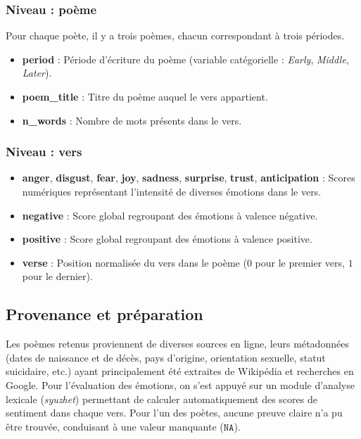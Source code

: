 \subsubsection{Niveau : poème}
Pour chaque poète, il y a trois poèmes, chacun correspondant à trois périodes.

\begin{itemize}
	\item \textbf{period} : Période d’écriture du poème (variable catégorielle : \textit{Early}, \textit{Middle}, \textit{Later}).
	\item \textbf{poem\_title} : Titre du poème auquel le vers appartient.
	\item \textbf{n\_words} : Nombre de mots présents dans le vers.
\end{itemize}	

\subsubsection{Niveau : vers}	
\begin{itemize}
	\item \textbf{anger}, \textbf{disgust}, \textbf{fear}, \textbf{joy}, \textbf{sadness}, \textbf{surprise}, \textbf{trust}, \textbf{anticipation} : Scores numériques représentant l’intensité de diverses émotions dans le vers.
	\item \textbf{negative} : Score global regroupant des émotions à valence négative.
	\item \textbf{positive} : Score global regroupant des émotions à valence positive.
	\item \textbf{verse} : Position normalisée du vers dans le poème (\(0\) pour le premier vers, \(1\) pour le dernier).
\end{itemize}

\subsection*{Provenance et préparation}
Les poèmes retenus proviennent de diverses sources en ligne, leurs métadonnées (dates de naissance et de décès, pays d’origine, orientation sexuelle, statut suicidaire, etc.) ayant principalement été extraites de Wikipédia et recherches en Google. Pour l’évaluation des émotions, on s’est appuyé sur un module d’analyse lexicale (\emph{syuzhet}) permettant de calculer automatiquement des scores de sentiment dans chaque vers.
Pour l’un des poètes, aucune preuve claire n’a pu être trouvée, conduisant à une valeur manquante (\(\texttt{NA}\)).

